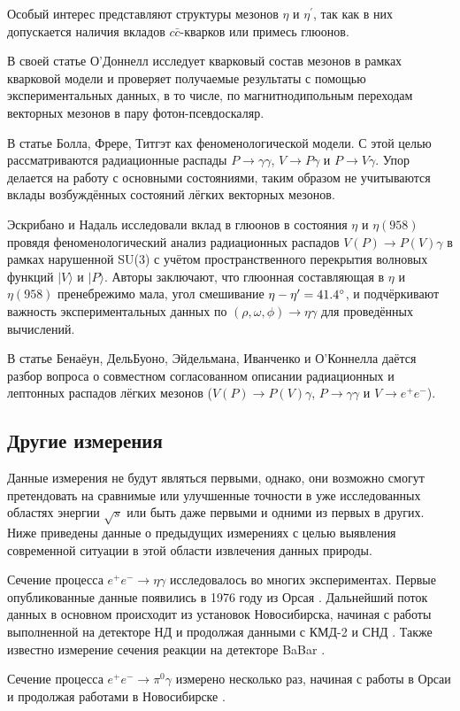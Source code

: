 Особый интерес представляют структуры мезонов $\eta$ и $\eta^\prime$, так как в них допускается наличия вкладов $c\bar{c}$-кварков или примесь глюонов. 

В своей статье О'Доннелл \cite{ODonnell:1981sj} исследует кварковый состав мезонов в
рамках кварковой модели и проверяет получаемые результаты с помощью
экспериментальных данных, в то числе, по магнитнодипольным переходам
векторных мезонов в пару фотон-псевдоскаляр.

В статье Болла, Фрере, Титгэт \cite{Ball:1995zv} ках феноменологической модели.%
С этой целью рассматриваются радиационные распады
$P \to \gamma \gamma$, $V \to P \gamma$ и $P \to V \gamma$. Упор
делается на работу с основными состояниями, таким образом не учитываются
вклады возбуждённых состояний лёгких векторных мезонов.

Эскрибано и Надаль \cite{Escribano:2007cd} исследовали вклад в глюонов в состояния $\eta$
и $\eta(958)$ провядя феноменологический анализ радиационных распадов
$V (P) \to P (V) \gamma$ в рамках нарушенной SU(3) с учётом
пространственного перекрытия волновых функций $| V \rangle$ и
$|P \rangle$. Авторы заключают, что глюонная составляющая в $\eta$ и
$\eta(958)$ пренебрежимо мала, угол смешивание
$\eta-\eta^\prime = \ang{41.4 \pm 1.3}$, и подчёркивают важность
экспериментальных данных по $(\rho, \omega, \phi ) \to \eta \gamma$ для
проведённых вычислений.

В статье Бенаёун, ДельБуоно, Эйдельмана, Иванченко и О'Коннелла \cite{Benayoun:1999fv} даётся разбор
вопроса о совместном согласованном описании радиационных и лептонных
распадов лёгких мезонов ($V(P) \to P(V)\gamma$, $P \to \gamma \gamma$ и
$V \to e^+ e^-$).


\subsection{Другие измерения}\label{other-measurments}

Данные измерения не будут являться первыми, однако, они возможно смогут
претендовать на сравнимые или улучшенные точности в уже исследованных
областях энергии $\sqrt{s}$ или быть даже первыми и одними из первых в
других. Ниже приведены данные о предыдущих измерениях с целью выявления
современной ситуации в этой области извлечения данных природы.

Сечение процесса $e^+e^-\to\eta\gamma$ исследовалось во многих экспериментах.
Первые опубликованные данные появились в 1976 году из Орсая \cite{Cosme:1975rs}.
Дальнейший поток данных в основном происходит из установок Новосибирска, начиная с работы выполненной на детекторе НД \cite{Druzhinin:1984zq} и продолжая данными с КМД-2 \cite{Akhmetshin:1995vz, Akhmetshin:1999zv, Akhmetshin:2001hm, Akhmetshin:2004gw} и СНД \cite{Achasov:1997nq, Achasov:2000zd, Achasov:2006dv, Achasov:2013eli}.
Также известно измерение сечения реакции на детекторе BaBar \cite{Aubert:2006cy}.

Сечение процесса $e^+e^-\to\pi^0\gamma$ измерено несколько раз, начиная с работы в Орсаи \cite{Cosme:1975rs} и продолжая работами в Новосибирске \cite{Druzhinin:1984zq, Achasov:2000zd, Achasov:2003ed, Akhmetshin:2004gw, Achasov:2016bfr}.